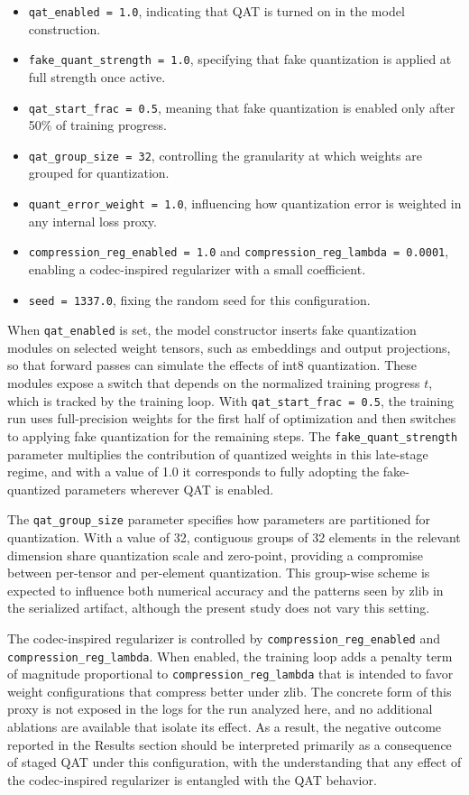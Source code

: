 \documentclass{article}
\begin{document}
\begin{itemize}
  \item \texttt{qat\_enabled = 1.0}, indicating that QAT is turned on in the model construction.
  \item \texttt{fake\_quant\_strength = 1.0}, specifying that fake quantization is applied at full strength once active.
  \item \texttt{qat\_start\_frac = 0.5}, meaning that fake quantization is enabled only after 50\% of training progress.
  \item \texttt{qat\_group\_size = 32}, controlling the granularity at which weights are grouped for quantization.
  \item \texttt{quant\_error\_weight = 1.0}, influencing how quantization error is weighted in any internal loss proxy.
  \item \texttt{compression\_reg\_enabled = 1.0} and \texttt{compression\_reg\_lambda = 0.0001}, enabling a codec-inspired regularizer with a small coefficient.
  \item \texttt{seed = 1337.0}, fixing the random seed for this configuration.
\end{itemize}

When \texttt{qat\_enabled} is set, the model constructor inserts fake quantization modules on selected weight tensors, such as embeddings and output projections, so that forward passes can simulate the effects of int8 quantization. These modules expose a switch that depends on the normalized training progress \(t\), which is tracked by the training loop. With \texttt{qat\_start\_frac = 0.5}, the training run uses full-precision weights for the first half of optimization and then switches to applying fake quantization for the remaining steps. The \texttt{fake\_quant\_strength} parameter multiplies the contribution of quantized weights in this late-stage regime, and with a value of 1.0 it corresponds to fully adopting the fake-quantized parameters wherever QAT is enabled.

The \texttt{qat\_group\_size} parameter specifies how parameters are partitioned for quantization. With a value of 32, contiguous groups of 32 elements in the relevant dimension share quantization scale and zero-point, providing a compromise between per-tensor and per-element quantization. This group-wise scheme is expected to influence both numerical accuracy and the patterns seen by zlib in the serialized artifact, although the present study does not vary this setting.

The codec-inspired regularizer is controlled by \texttt{compression\_reg\_enabled} and \texttt{compression\_reg\_lambda}. When enabled, the training loop adds a penalty term of magnitude proportional to \texttt{compression\_reg\_lambda} that is intended to favor weight configurations that compress better under zlib. The concrete form of this proxy is not exposed in the logs for the run analyzed here, and no additional ablations are available that isolate its effect. As a result, the negative outcome reported in the Results section should be interpreted primarily as a consequence of staged QAT under this configuration, with the understanding that any effect of the codec-inspired regularizer is entangled with the QAT behavior.
\end{document}
